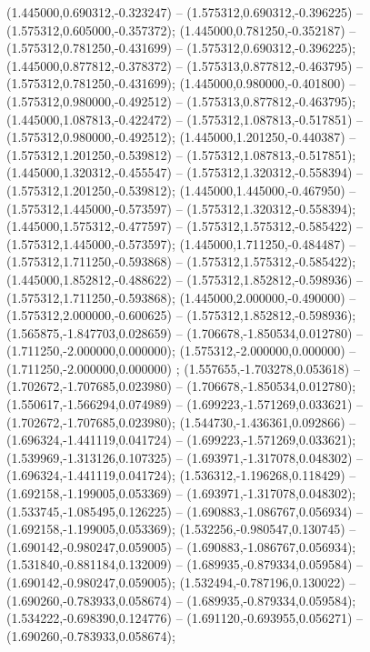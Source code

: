  (1.445000,0.690312,-0.323247) -- (1.575312,0.690312,-0.396225) -- (1.575312,0.605000,-0.357372);
 (1.445000,0.781250,-0.352187) -- (1.575312,0.781250,-0.431699) -- (1.575312,0.690312,-0.396225);
 (1.445000,0.877812,-0.378372) -- (1.575313,0.877812,-0.463795) -- (1.575312,0.781250,-0.431699);
 (1.445000,0.980000,-0.401800) -- (1.575312,0.980000,-0.492512) -- (1.575313,0.877812,-0.463795);
 (1.445000,1.087813,-0.422472) -- (1.575312,1.087813,-0.517851) -- (1.575312,0.980000,-0.492512);
 (1.445000,1.201250,-0.440387) -- (1.575312,1.201250,-0.539812) -- (1.575312,1.087813,-0.517851);
 (1.445000,1.320312,-0.455547) -- (1.575312,1.320312,-0.558394) -- (1.575312,1.201250,-0.539812);
 (1.445000,1.445000,-0.467950) -- (1.575312,1.445000,-0.573597) -- (1.575312,1.320312,-0.558394);
 (1.445000,1.575312,-0.477597) -- (1.575312,1.575312,-0.585422) -- (1.575312,1.445000,-0.573597);
 (1.445000,1.711250,-0.484487) -- (1.575312,1.711250,-0.593868) -- (1.575312,1.575312,-0.585422);
 (1.445000,1.852812,-0.488622) -- (1.575312,1.852812,-0.598936) -- (1.575312,1.711250,-0.593868);
 (1.445000,2.000000,-0.490000) -- (1.575312,2.000000,-0.600625) -- (1.575312,1.852812,-0.598936);
 (1.565875,-1.847703,0.028659) -- (1.706678,-1.850534,0.012780) -- (1.711250,-2.000000,0.000000);
 (1.575312,-2.000000,0.000000) -- (1.711250,-2.000000,0.000000) ;
 (1.557655,-1.703278,0.053618) -- (1.702672,-1.707685,0.023980) -- (1.706678,-1.850534,0.012780);
 (1.550617,-1.566294,0.074989) -- (1.699223,-1.571269,0.033621) -- (1.702672,-1.707685,0.023980);
 (1.544730,-1.436361,0.092866) -- (1.696324,-1.441119,0.041724) -- (1.699223,-1.571269,0.033621);
 (1.539969,-1.313126,0.107325) -- (1.693971,-1.317078,0.048302) -- (1.696324,-1.441119,0.041724);
 (1.536312,-1.196268,0.118429) -- (1.692158,-1.199005,0.053369) -- (1.693971,-1.317078,0.048302);
 (1.533745,-1.085495,0.126225) -- (1.690883,-1.086767,0.056934) -- (1.692158,-1.199005,0.053369);
 (1.532256,-0.980547,0.130745) -- (1.690142,-0.980247,0.059005) -- (1.690883,-1.086767,0.056934);
 (1.531840,-0.881184,0.132009) -- (1.689935,-0.879334,0.059584) -- (1.690142,-0.980247,0.059005);
 (1.532494,-0.787196,0.130022) -- (1.690260,-0.783933,0.058674) -- (1.689935,-0.879334,0.059584);
 (1.534222,-0.698390,0.124776) -- (1.691120,-0.693955,0.056271) -- (1.690260,-0.783933,0.058674);
